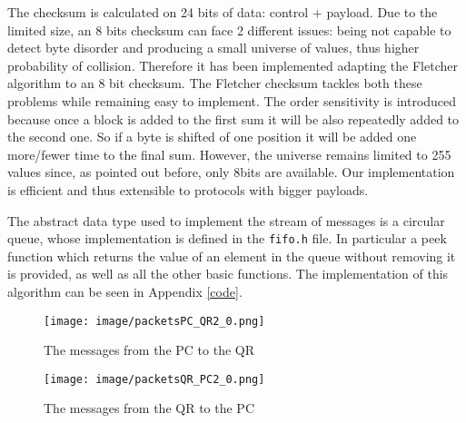 \documentclass[a4paper]{article}
\begin{document}
The checksum is calculated on 24 bits of data: control + payload. Due to the limited size, an 8 bits checksum can face 2 different issues: being not capable to detect byte disorder and producing a small universe of values, thus higher probability of collision. Therefore it has been implemented adapting the Fletcher algorithm to an 8 bit checksum. The Fletcher checksum tackles both these problems while remaining easy to implement. The order sensitivity is introduced because once a block is added to the first sum it will be also repeatedly added to the second one. So if a byte is shifted of one position it will be added one more/fewer time to the final sum. However, the universe remains limited to 255 values since, as pointed out before, only 8bits are available. Our implementation is efficient and thus extensible to protocols with bigger payloads.

The abstract data type used to implement the stream of messages is a circular queue, whose implementation is defined in the \texttt{fifo.h} file. In particular a peek function which returns the value of an element in the queue without removing it is provided, as well as all the other basic functions. The implementation of this algorithm can be seen in Appendix \ref{code}.

\vspace{0em}

\begin{figure}[h!]
  \centering
  \texttt{[image: image/packetsPC\_QR2\_0.png]}
  \caption{The messages from the PC to the QR}
  \label{fig:packet1}
\end{figure}
\begin{figure}[h!]
  \centering
  \texttt{[image: image/packetsQR\_PC2\_0.png]}
  \caption{The messages from the QR to the PC}
  \label{fig:packet2}
\end{figure}
\end{document}
